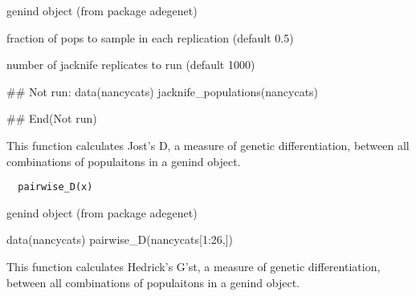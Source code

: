 \documentclass[letterpaper]{book}
\begin{document}
%
\begin{Arguments}
\begin{ldescription}
\item[\code{x}] genind object (from package adegenet)

\item[\code{sample\_frac}] fraction of pops to sample in each
replication (default 0.5)

\item[\code{nreps}] number of jacknife replicates to run
(default 1000)
\end{ldescription}
\end{Arguments}
%
\begin{Examples}
\begin{ExampleCode}
## Not run: 
data(nancycats)
jacknife_populations(nancycats)

## End(Not run)
\end{ExampleCode}
\end{Examples}
%
\begin{Description}\relax
This function calculates Jost's D, a measure of genetic
differentiation, between all combinations of populaitons
in a genind object.
\end{Description}
%
\begin{Usage}
\begin{verbatim}
  pairwise_D(x)
\end{verbatim}
\end{Usage}
%
\begin{Arguments}
\begin{ldescription}
\item[\code{x}] genind object (from package adegenet)
\end{ldescription}
\end{Arguments}
%
\begin{Examples}
\begin{ExampleCode}
data(nancycats)
pairwise_D(nancycats[1:26,])
\end{ExampleCode}
\end{Examples}
%
\begin{Description}\relax
This function calculates Hedrick's G'st, a measure of
genetic differentiation, between all combinations of
populaitons in a genind object.
\end{Description}
%
\end{document}
